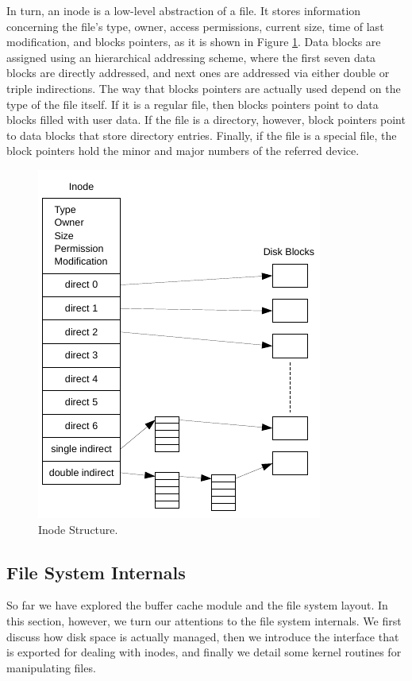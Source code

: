 	In turn, an inode is a low-level abstraction of a file. It stores
	information concerning the file's type, owner, access permissions,
	current size, time of last modification, and blocks pointers, as it
	is shown in Figure \ref{figure: inode structure}. Data blocks are
	assigned using an hierarchical addressing scheme, where the first
	seven data blocks are directly addressed, and next ones are
	addressed via either double or triple indirections. The way that
	blocks pointers are actually used depend on the type of the file
	itself. If it is a regular file, then blocks pointers point to data
	blocks filled with user data. If the file is a directory, however,
	block pointers point to data blocks that store directory entries.
	Finally, if the file is a special file, the block pointers hold the
	minor and major numbers of the referred device.

	\begin{figure}
		\centering
		\includegraphics[scale=1.1]{img/inode-structure}
		\caption{Inode Structure.}
		\label{figure: inode structure}
	\end{figure}

	\subsection{File System Internals}
	\label{subsection: file system internals}

		So far we have explored the buffer cache module and the file
		system layout. In this section, however, we turn our attentions
		to the file system internals. We first discuss how disk space is
		actually managed, then we introduce the interface that is
		exported for dealing with inodes, and finally we detail some
		kernel routines for manipulating files.

